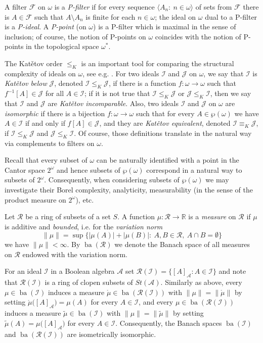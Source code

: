 \documentclass[a4paper,11pt,fleqn]{amsart}
\theoremstyle{definition}
\theoremstyle{remark}
\numberwithin{equation}{section}
\newcommand{\N}{\mathbb{N}}
\newcommand{\R}{\mathbb{R}}
\newcommand{\aA}{\mathcal{A}}
\newcommand{\fF}{\mathcal{F}}
\newcommand{\iI}{\mathcal{I}}
\newcommand{\jJ}{\mathcal{J}}
\newcommand{\rR}{\mathcal{R}}
\DeclareMathOperator{\ba}{ba}
\newcommand{\seqn}[1]{\big\langle#1\colon\ n\io\big\rangle}
\newcommand{\clopen}[1]{\left[#1\right]}
\newcommand{\io}{\in\omega}%
\newcommand{\wo}{{\wp(\omega)}}%
\newcommand{\Cantor}{2^\omega}
\begin{document}
A filter $\fF$ on $\omega$ is a \textit{P-filter} if for every sequence $\seqn{A_n}$ of sets from $\fF$ there is $A\in\fF$ such that $A\setminus A_n$ is finite for each $n\io$; the ideal on $\omega$ dual to a P-filter is a \textit{P-ideal}. A \textit{P-point} (on $\omega$) is a P-filter which is maximal in the sense of inclusion; of course, the notion of P-points on $\omega$ coincides with the notion of P-points in the topological space $\omega^*$.

The Kat\v{e}tov order $\le_K$ is an important tool for comparing the structural complexity of ideals on $\omega$, see e.g. \cite{Hru17}. For two ideals $\iI$ and $\jJ$ on $\omega$, we say that $\iI$ is \textit{Kat\v{e}tov below} $\jJ$, denoted $\iI\le_K\jJ$, if there is a function $f\colon\omega\to\omega$ such that $f^{-1}[A]\in\jJ$ for all $A\in\iI$; if it is not true that $\iI\le_K\jJ$ or $\jJ\le_K\iI$, then we say that $\iI$ and $\jJ$ are \textit{Kat\v{e}tov incomparable}. Also, two ideals $\iI$ and $\jJ$ on $\omega$ are \textit{isomorphic} if there is a bijection $f\colon\omega\to\omega$ such that for every $A\in\wo$ we have $A\in\iI$ if and only if $f[A]\in\jJ$, and they are \textit{Kat\v{e}tov equivalent}, denoted $\iI\equiv_K\jJ$, if $\iI\le_K\jJ$ and $\jJ\le_K\iI$. Of course, those definitions translate in the natural way via complements to filters on $\omega$.

Recall that every subset of $\omega$ can be naturally identified with a point in the Cantor space $\Cantor$ and hence subsets of $\wo$ correspond in a natural way to subsets of $\Cantor$. Consequently, when considering subsets of $\wo$ we may investigate their Borel complexity, analyticity, measurability (in the sense of the product measure on $\Cantor$), etc.

\medskip

Let $\rR$ be a ring of subsets of a set $S$. A function $\mu\colon\rR\to\R$ is a \textit{measure} on $\rR$ if $\mu$ is additive and \textit{bounded}, i.e. for the \textit{variation norm}
\[\|\mu\|=\sup\big\{|\mu(A)|+|\mu(B)|\colon\ A,B\in\rR,\ A\cap B=\emptyset\big\}\]
we have $\|\mu\|<\infty$. By $\ba(\rR)$ we denote the Banach space of all measures on $\rR$ endowed with the variation norm.

For an ideal $\iI$ in a Boolean algebra $\aA$ set $\rR(\iI)=\big\{\clopen{A}_\aA\colon A\in\iI\big\}$ and note that $\rR(\iI)$ is a ring of clopen subsets of $St(\aA)$. Similarly as above, every $\mu\in\ba(\iI)$ induces a measure $\mathring{\mu}\in\ba(\rR(\iI))$ with $\|\mu\|=\|\mathring{\mu}\|$ by setting $\mathring{\mu}\big(\clopen{A}_\aA\big)=\mu(A)$ for every $A\in\iI$, and every $\mu\in\ba(\rR(\iI))$ induces a measure $\tilde{\mu}\in\ba(\iI)$ with $\|\mu\|=\|\tilde{\mu}\|$ by setting $\tilde{\mu}(A)=\mu\big(\clopen{A}_\aA\big)$ for every $A\in\iI$. Consequently, the Banach spaces $\ba(\iI)$ and $\ba(\rR(\iI))$ are isometrically isomorphic.
\end{document}

